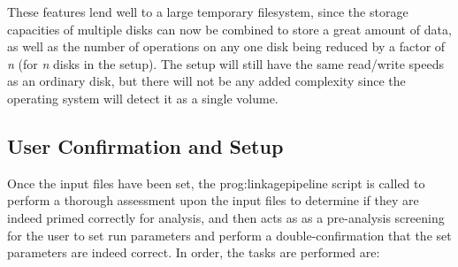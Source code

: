 These features lend well to a large temporary filesystem, since the storage capacities of multiple disks can now be combined to store a great amount of data, as well as the number of operations on any one disk being reduced by a factor of \textit{n} (for \textit{n} disks in the setup). The setup will still have the same read/write speeds as an ordinary disk, but there will not be any added complexity since the operating system will detect it as a single volume.

\subsection{User Confirmation and Setup}

Once the input files have been set, the \gls{prog:linkagepipeline} script is called to perform a thorough assessment upon the input files to determine if they are indeed primed correctly for analysis, and then acts as as a pre-analysis screening for the user to set run parameters and perform a double-confirmation that the set parameters are indeed correct. In order, the tasks are performed are:

